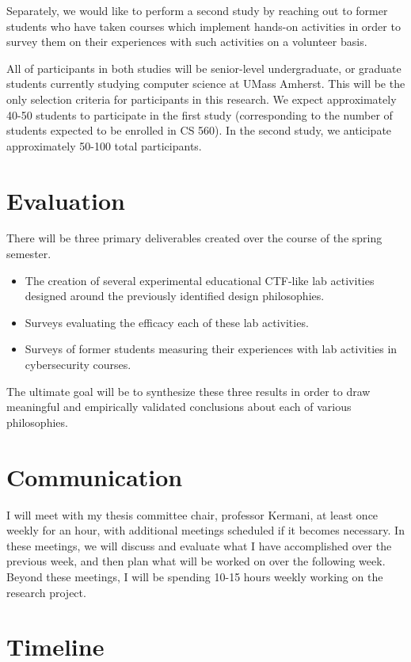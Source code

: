 \documentclass{article}
\begin{document}
    Separately, we would like to perform a second study by reaching out to former students who have taken courses which implement hands-on activities in order to survey them on their experiences with such activities on a volunteer basis. 

    All of participants in both studies will be senior-level undergraduate, or graduate students currently studying computer science at UMass Amherst. 
    This will be the only selection criteria for participants in this research. 
    We expect approximately 40-50 students to participate in the first study (corresponding to the number of students expected to be enrolled in CS 560).
    In the second study, we anticipate approximately 50-100 total participants. 

\section{Evaluation}

    There will be three primary deliverables created over the course of the spring semester.

    \begin{itemize}
        \item The creation of several experimental educational CTF-like lab activities designed around the previously identified design philosophies. 
        \item Surveys evaluating the efficacy each of these lab activities.\
        \item Surveys of former students measuring their experiences with lab activities in cybersecurity courses. 
    \end{itemize}

    The ultimate goal will be to synthesize these three results in order to draw meaningful and empirically validated conclusions about each of various philosophies.
    

\section{Communication}

    I will meet with my thesis committee chair, professor Kermani, at least once weekly for an hour, with additional meetings scheduled if it becomes necessary. 
    In these meetings, we will discuss and evaluate what I have accomplished over the previous week, and then plan what will be worked on over the following week. 
    Beyond these meetings, I will be spending 10-15 hours weekly working on the research project. %
    
\section{Timeline}

\end{document}
